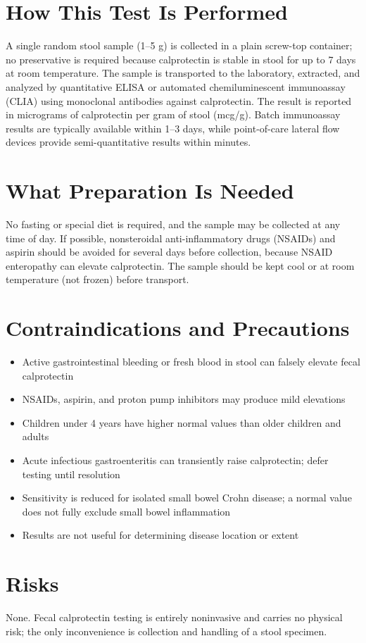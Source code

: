 \section*{How This Test Is Performed}
A single random stool sample (1--5 g) is collected in a plain screw-top container; no preservative is required because calprotectin is stable in stool for up to 7 days at room temperature. The sample is transported to the laboratory, extracted, and analyzed by quantitative ELISA or automated chemiluminescent immunoassay (CLIA) using monoclonal antibodies against calprotectin. The result is reported in micrograms of calprotectin per gram of stool (mcg/g). Batch immunoassay results are typically available within 1--3 days, while point-of-care lateral flow devices provide semi-quantitative results within minutes.
\section*{What Preparation Is Needed}
No fasting or special diet is required, and the sample may be collected at any time of day. If possible, nonsteroidal anti-inflammatory drugs (NSAIDs) and aspirin should be avoided for several days before collection, because NSAID enteropathy can elevate calprotectin. The sample should be kept cool or at room temperature (not frozen) before transport.
\section*{Contraindications and Precautions}
\begin{itemize}
  \item Active gastrointestinal bleeding or fresh blood in stool can falsely elevate fecal calprotectin
  \item NSAIDs, aspirin, and proton pump inhibitors may produce mild elevations
  \item Children under 4 years have higher normal values than older children and adults
  \item Acute infectious gastroenteritis can transiently raise calprotectin; defer testing until resolution
  \item Sensitivity is reduced for isolated small bowel Crohn disease; a normal value does not fully exclude small bowel inflammation
  \item Results are not useful for determining disease location or extent
\end{itemize}
\section*{Risks}
None. Fecal calprotectin testing is entirely noninvasive and carries no physical risk; the only inconvenience is collection and handling of a stool specimen.
